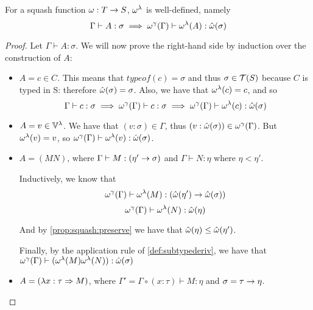 \documentclass[main.tex]{subfiles}
\begin{document}
\begin{prop}
    For a squash function $\omega: T \rightarrow S$, $\omega^{\lambda}$ is
    well-defined, namely
    \[ \Gamma \vdash A : \sigma \implies
        \omega^{\gamma}(\Gamma) \vdash \omega^{\lambda}(A) : \hat{\omega}(\sigma) \]
\end{prop}
\begin{proof}
    Let $\Gamma \vdash A : \sigma$. We will now prove the right-hand side
    by induction over the construction of $A$:
    \begin{itemize}
        \item $A = c \in C$. This means that $typeof(c) = \sigma$ and thus
            $\sigma \in \mathcal{T}( S )$ because $C$ is typed in S: therefore
            $\hat{\omega}(\sigma) = \sigma$. Also, we have that $\omega^{\lambda}(c) = c$,
            and so \[ \Gamma \vdash c : \sigma \implies
                \omega^{\gamma}(\Gamma) \vdash c : \sigma \implies
                \omega^{\gamma}(\Gamma) \vdash \omega^{\lambda}(c) : \hat{\omega}(\sigma) \]

        \item $A = v \in \mathbb{V}^{\lambda}$. We have that $(v : \sigma) \in \Gamma$, thus
            $(v : \hat{\omega}(\sigma)) \in \omega^{\gamma}(\Gamma)$. But $\omega^{\lambda}(v) = v$,
            so $\omega^{\gamma}(\Gamma) \vdash \omega^{\lambda}(v) : \hat{\omega}(\sigma)$.

        \item $A = (MN)$, where $\Gamma \vdash M : (\eta' \rightarrow \sigma)$
            and $\Gamma \vdash N : \eta$ where $\eta \less \eta'$.

            Inductively, we know that
            \begin{equation}
                \omega^{\gamma}(\Gamma) \vdash \omega^{\lambda}(M) : (\hat{\omega}(\eta')
                    \rightarrow \hat{\omega}(\sigma))
            \end{equation}
            \begin{equation}
                \omega^{\gamma}(\Gamma) \vdash \omega^{\lambda}(N) : \hat{\omega}(\eta)
            \end{equation}

            And by \cref{prop:squash:preserve} we have that $\hat{\omega}(\eta)
                \leq \hat{\omega}(\eta')$.

            Finally, by the application rule of \cref{def:subtypederiv},
            we have that $\omega^{\gamma}(\Gamma) \vdash (\omega^{\lambda}(M) \omega^{\lambda}(N))
            : \hat{\omega}(\sigma) $

        \item $A = (\lambda x : \tau \Rightarrow M)$, where $\Gamma' = \Gamma \circ
            (x : \tau) \vdash M : \eta$ and $\sigma = \tau \rightarrow \eta$.


\end{itemize}
\end{proof}
\end{document}
